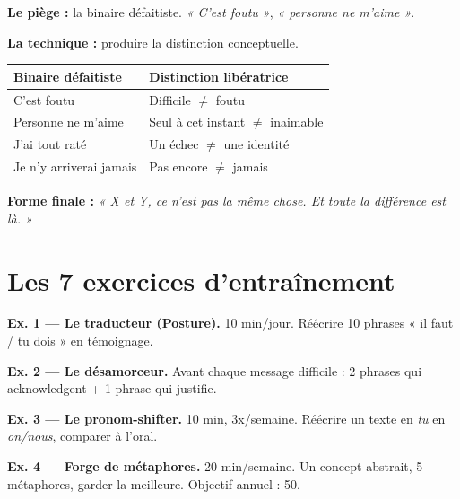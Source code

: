 \documentclass[11pt,a4paper]{article}
\begin{document}
\textbf{Le piège :} la binaire défaitiste. \textit{« C'est foutu »}, \textit{« personne ne m'aime »}.

\textbf{La technique :} produire la distinction conceptuelle.

\vspace{0.5em}
\begin{tabularx}{\linewidth}{XX}
\toprule
\textbf{Binaire défaitiste} & \textbf{Distinction libératrice} \\
\midrule
C'est foutu & Difficile $\neq$ foutu \\
Personne ne m'aime & Seul à cet instant $\neq$ inaimable \\
J'ai tout raté & Un échec $\neq$ une identité \\
Je n'y arriverai jamais & Pas encore $\neq$ jamais \\
\bottomrule
\end{tabularx}

\textbf{Forme finale :} \textit{« X et Y, ce n'est pas la même chose. Et toute la différence est là. »}

\newpage

\section{Les 7 exercices d'entraînement}

\begin{tcolorbox}[colback=white, colframe=accent, boxrule=0.6pt]
\textbf{Ex. 1 — Le traducteur (Posture).} 10 min/jour. Réécrire 10 phrases « il faut / tu dois » en témoignage.
\end{tcolorbox}

\begin{tcolorbox}[colback=white, colframe=accent, boxrule=0.6pt]
\textbf{Ex. 2 — Le désamorceur.} Avant chaque message difficile : 2 phrases qui acknowledgent + 1 phrase qui justifie.
\end{tcolorbox}

\begin{tcolorbox}[colback=white, colframe=accent, boxrule=0.6pt]
\textbf{Ex. 3 — Le pronom-shifter.} 10 min, 3x/semaine. Réécrire un texte en \textit{tu} en \textit{on/nous}, comparer à l'oral.
\end{tcolorbox}

\begin{tcolorbox}[colback=white, colframe=accent, boxrule=0.6pt]
\textbf{Ex. 4 — Forge de métaphores.} 20 min/semaine. Un concept abstrait, 5 métaphores, garder la meilleure. Objectif annuel : 50.
\end{tcolorbox}
\end{document}
